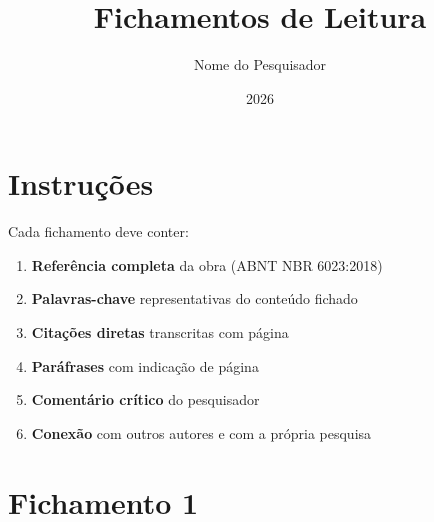 \documentclass[
  12pt,
  a4paper,
  brazilian
]{article}
\title{Fichamentos de Leitura}
\author{Nome do Pesquisador}
\date{2026}
\begin{document}
\maketitle

\section*{Instruções}

Cada fichamento deve conter:
\begin{enumerate}
  \item \textbf{Referência completa} da obra (ABNT NBR 6023:2018)
  \item \textbf{Palavras-chave} representativas do conteúdo fichado
  \item \textbf{Citações diretas} transcritas com página
  \item \textbf{Paráfrases} com indicação de página
  \item \textbf{Comentário crítico} do pesquisador
  \item \textbf{Conexão} com outros autores e com a própria pesquisa
\end{enumerate}

\newpage

\section*{Fichamento 1}
\end{document}
